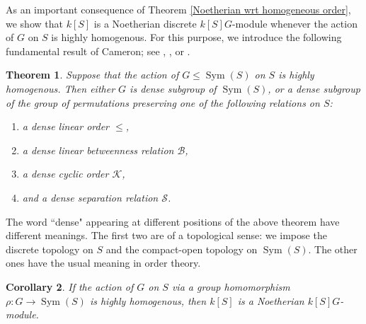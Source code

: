 \documentclass[11pt, reqno]{amsart}
\theoremstyle{plain}
\newtheorem{theorem}{Theorem}[section]
\newtheorem{corollary}[theorem]{Corollary}
\numberwithin{equation}{section}
\theoremstyle{definition}
\DeclareMathOperator{\Sym}{Sym}
\begin{document}
As an important consequence of Theorem \ref{Noetherian wrt homogeneous order}, we show that $k[S]$ is a Noetherian discrete $k[S]G$-module whenever the action of $G$ on $S$ is highly homogenous. For this purpose, we introduce the following fundamental result of Cameron; see \cite[Theorem 6.1]{Ca76}, \cite[3.10]{Ca}, or \cite[Theorem 13.1]{BMMN}.

\begin{theorem} \label{classification}
Suppose that the action of $G \leqslant \Sym(S)$ on $S$ is highly homogenous. Then either $G$ is dense subgroup of $\Sym(S)$, or a dense subgroup of the group of permutations preserving one of the following relations on $S$:
\begin{enumerate}
\item a dense linear order $\leqslant$,

\item a dense linear betweenness relation $\mathcal{B}$,

\item a dense cyclic order $\mathcal{K}$,

\item and a dense separation relation $\mathcal{S}$.
\end{enumerate}
\end{theorem}

The word ``dense" appearing at different positions of the above theorem have different meanings. The first two are of a topological sense: we impose the discrete topology on $S$ and the compact-open topology on $\Sym(S)$. The other ones have the usual meaning in order theory.

\begin{corollary} \label{highly homogenous result}
If the action of $G$ on $S$ via a group homomorphism $\rho: G \to \Sym(S)$ is highly homogenous, then $k[S]$ is a Noetherian $k[S]G$-module.
\end{corollary}
\end{document}
